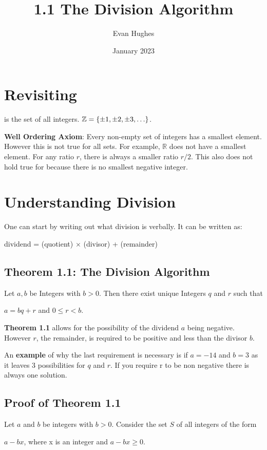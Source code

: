 \documentclass{article}
\title{1.1 The Division Algorithm}
\author{Evan Hughes}
\date{January 2023}
\begin{document}
\maketitle

\section*{Revisiting \integers}
\integers{} is the set of all integers.  $\mathbb{Z} = \{ \pm 1, \pm 2, \pm 3, \ldots\}$.
\vspace*{5mm}

\textbf{Well Ordering Axiom}: Every non-empty set of integers has a smallest element.
However this is not true for all sets.  For example, $\mathbb{R}$ does not have a smallest element.
For any ratio $r$, there is always a smaller ratio $r/2$.
This also does not hold true for \integers{} because there is no smallest negative integer. 


\section*{Understanding Division}

One can start by writing out what division is verbally. It can be written as: 
\begin{center}
    dividend = (quotient) $\times$ (divisor) + (remainder)
\end{center}

\subsection*{Theorem 1.1: The Division Algorithm}
Let $a, b$ be Integers with $b > 0$. Then there exist unique Integers $q$ and $r$ such
that
\begin{center}
    $a = bq + r$  and    $0 \leq{} r < b$.
\end{center}
\textbf{Theorem 1.1} allows for the possibility of the dividend $a$ being negative.
However $r$, the remainder, is required to be positive and less than the divisor $b$.

An \textbf{example} of why the last requirement is necessary is if $a = -14$ and $b = 3$
as it leaves 3 possibilities for $q$ and $r$. If you require r to be non negative there is always one solution.

\subsection*{Proof of Theorem 1.1}
Let $a$ and $b$ be integers with $b > 0$. 
Consider the set $S$ of all integers of the form
\begin{center}
    $a - bx$, where x is an integer and $a - bx \geq{} 0$.
\end{center}
\end{document}
